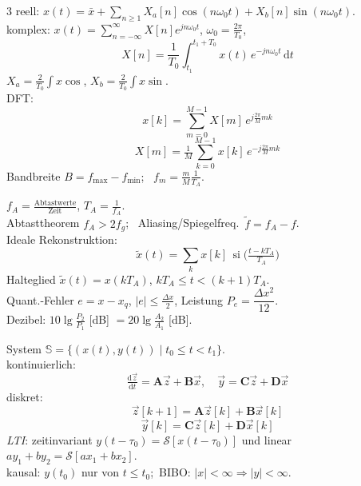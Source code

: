 \begin{multicols}{3}
reell: $x(t)=\bar x+\sum_{n\ge1}X_a[n]\cos(n\omega_0t)+X_b[n]\sin(n\omega_0t)$.\\
komplex: $x(t)=\sum_{n=-\infty}^{\infty}\! X[n]e^{jn\omega_0t}$, $\omega_0=\tfrac{2\pi}{T_0}$,
\[ X[n]=\frac{1}{T_0}\!\int_{t_1}^{t_1+T_0}\! x(t)\,e^{-jn\omega_0t}\,\mathrm dt \]
$X_a=\tfrac{2}{T_0}\!\int x\cos$, $X_b=\tfrac{2}{T_0}\!\int x\sin$.\\
DFT:
\[ x[k]=\sum_{m=0}^{M-1}\! X[m]\,e^{j\frac{2\pi}{M}mk} \]
\[ X[m]=\tfrac1M\sum_{k=0}^{M-1}\! x[k]\,e^{-j\frac{2\pi}{M}mk} \]
Bandbreite $B=f_{\max}-f_{\min}$; \ $f_m=\tfrac{m}{M}\tfrac{1}{T_A}$.

$f_A=\tfrac{\text{Abtastwerte}}{\text{Zeit}}$, $T_A=\tfrac{1}{f_A}$.\\
Abtasttheorem $f_A>2f_g$; \ Aliasing/Spiegelfreq.\ $\tilde f=f_A-f$.\\
Ideale Rekonstruktion:
\[ \tilde x(t)=\sum_k x[k]\,\operatorname{si}\!\big(\tfrac{t-kT_A}{T_A}\big) \]
Halteglied $\tilde x(t)=x(kT_A)$, $kT_A\le t<(k{+}1)T_A$.\\
Quant.-Fehler $e=x-x_q$, $|e|\le\tfrac{\Delta x}{2}$, Leistung $P_e=\dfrac{\Delta x^2}{12}$.\\
Dezibel: $10\lg\!\tfrac{P_2}{P_1}$ [dB] $=20\lg\!\tfrac{A_2}{A_1}$ [dB].

System $\mathbb S=\{(x(t),y(t))\mid t_0\le t<t_1\}$.\\
kontinuierlich:
\[ \tfrac{\mathrm d\vec z}{\mathrm dt}=\mathbf A\vec z+\mathbf B\vec x,\quad \vec y=\mathbf C\vec z+\mathbf D\vec x \]
diskret:
\[ \vec z[k{+}1]=\mathbf A\vec z[k]+\mathbf B\vec x[k] \]
\[ \vec y[k]=\mathbf C\vec z[k]+\mathbf D\vec x[k] \]
\emph{LTI}: zeitinvariant $y(t-\tau_0)=\mathcal S[x(t-\tau_0)]$ und linear
$a y_1+b y_2=\mathcal S[a x_1+b x_2]$.\\
kausal: $y(t_0)$ nur von $t\le t_0$;\ BIBO: $|x|<\infty\Rightarrow|y|<\infty$.


\end{multicols}
